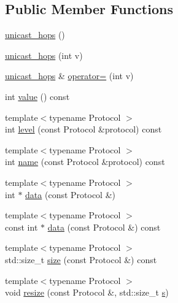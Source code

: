 \subsection*{Public Member Functions}
\begin{DoxyCompactItemize}
\item 
\hyperlink{classasio_1_1ip_1_1detail_1_1socket__option_1_1unicast__hops_ae984eb33d1b9f180223a122f909b5ade}{unicast\+\_\+hops} ()
\item 
\hyperlink{classasio_1_1ip_1_1detail_1_1socket__option_1_1unicast__hops_a0f5431cdba16f9bb77e9d6af176b94c0}{unicast\+\_\+hops} (int v)
\item 
\hyperlink{classasio_1_1ip_1_1detail_1_1socket__option_1_1unicast__hops}{unicast\+\_\+hops} \& \hyperlink{classasio_1_1ip_1_1detail_1_1socket__option_1_1unicast__hops_a8613cb0c4cf3acdddecb5bf5b4459d7a}{operator=} (int v)
\item 
int \hyperlink{classasio_1_1ip_1_1detail_1_1socket__option_1_1unicast__hops_a4ec6721e0eabf3d9f36fa072b4fa08b0}{value} () const 
\item 
{\footnotesize template$<$typename Protocol $>$ }\\int \hyperlink{classasio_1_1ip_1_1detail_1_1socket__option_1_1unicast__hops_a4b7f3f529f252fb5069f4f9c54bfe8bc}{level} (const Protocol \&protocol) const 
\item 
{\footnotesize template$<$typename Protocol $>$ }\\int \hyperlink{classasio_1_1ip_1_1detail_1_1socket__option_1_1unicast__hops_a8d2f7022699f53dcd059b0d52f9d5f2e}{name} (const Protocol \&protocol) const 
\item 
{\footnotesize template$<$typename Protocol $>$ }\\int $\ast$ \hyperlink{classasio_1_1ip_1_1detail_1_1socket__option_1_1unicast__hops_ae65020d83dc6b28b1ce2c1aa73080a08}{data} (const Protocol \&)
\item 
{\footnotesize template$<$typename Protocol $>$ }\\const int $\ast$ \hyperlink{classasio_1_1ip_1_1detail_1_1socket__option_1_1unicast__hops_a6a7d90389069a7f964c49bdf360bbdf8}{data} (const Protocol \&) const 
\item 
{\footnotesize template$<$typename Protocol $>$ }\\std\+::size\+\_\+t \hyperlink{classasio_1_1ip_1_1detail_1_1socket__option_1_1unicast__hops_a79844e706f2aeed1f248e7cbbd34a71b}{size} (const Protocol \&) const 
\item 
{\footnotesize template$<$typename Protocol $>$ }\\void \hyperlink{classasio_1_1ip_1_1detail_1_1socket__option_1_1unicast__hops_a885abf220bbf292d2e5d7ab037db647b}{resize} (const Protocol \&, std\+::size\+\_\+t \hyperlink{group__async__connect_ga31ab74b9ea6c77932dddd016cfc7920a}{s})
\end{DoxyCompactItemize}



